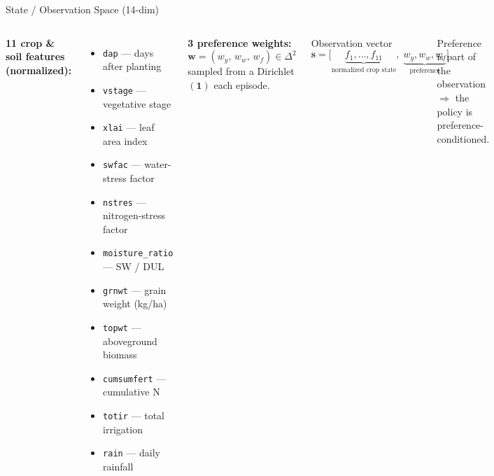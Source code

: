 \documentclass[10pt,aspectratio=169]{beamer}
\newcommand{\wvec}{\mathbf{w}}
\newcommand{\sten}{\mathbf{s}}
\begin{document}
\begin{frame}{State / Observation Space (14-dim)}
  \small
  \begin{columns}[T]
    \textbf{11 crop \& soil features (normalized):}
    \begin{itemize}\setlength\itemsep{0.1em}
      \item \texttt{dap} --- days after planting
      \item \texttt{vstage} --- vegetative stage
      \item \texttt{xlai} --- leaf area index
      \item \texttt{swfac} --- water-stress factor
      \item \texttt{nstres} --- nitrogen-stress factor
      \item \texttt{moisture\_ratio} --- SW / DUL
      \item \texttt{grnwt} --- grain weight (kg/ha)
      \item \texttt{topwt} --- aboveground biomass
      \item \texttt{cumsumfert} --- cumulative N
      \item \texttt{totir} --- total irrigation
      \item \texttt{rain} --- daily rainfall
    \end{itemize}

    \textbf{3 preference weights:}
    \[ \wvec = (w_y, \, w_w, \, w_f) \in \Delta^2 \]
    sampled from a Dirichlet$(\mathbf{1})$ each episode.

    \vspace{1em}
    \begin{block}{Observation vector}
    \[
      \sten = \big[\underbrace{f_1, \dots, f_{11}}_{\text{normalized crop state}}, \;
                   \underbrace{w_y, w_w, w_f}_{\text{preference}}\big]
    \]
    \end{block}
    \textcolor{cGray}{\small Preference is part of the observation $\Rightarrow$
    the policy is preference-conditioned.}
  \end{columns}
\end{frame}
\end{document}
